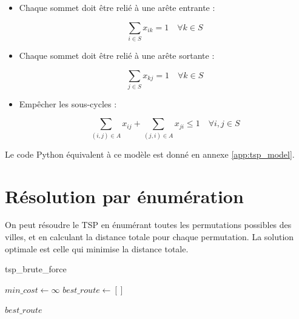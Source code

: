\begin{itemize}
    \item Chaque sommet doit être relié à une arête entrante :
    
    \begin{equation}
        \sum_{i \in S} x_{ik} = 1 \quad \forall k \in S
    \end{equation}
        

    \item Chaque sommet doit être relié à une arête sortante :
    
    \begin{equation}
        \sum_{j \in S} x_{kj} = 1 \quad \forall k \in S
    \end{equation}

    \item Empêcher les sous-cycles :
    
    \begin{equation}
        \sum_{(i,j) \in A} x_{ij} + \sum_{(j,i) \in A} x_{ji} \leq 1 \quad \forall i,j \in S
    \end{equation}
\end{itemize}

Le code Python équivalent à ce modèle est donné en annexe \ref{app:tsp_model}.

\section{Résolution par énumération}

On peut résoudre le \ac{TSP} en énumérant toutes les permutations possibles des villes, et en calculant la distance totale pour chaque permutation. La solution optimale est celle qui minimise la distance totale.

\begin{algorithm}[H]
    \caption{tsp\_brute\_force}\label{alg:tsp_enum}

    $min\_cost \gets \infty$\;
    $best\_route \gets []$\;

    \Return $best\_route$\;

\end{algorithm}

